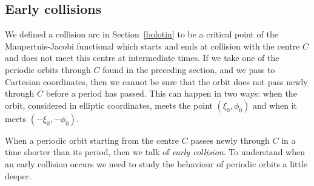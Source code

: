 \documentclass[a4paper]{article}
\begin{document}
\subsection{Early collisions}
\label{early_coll}
We defined a collision arc in Section~\ref{bolotin} to be a critical
point of the Maupertuis-Jacobi functional which starts and ends at
collision with the centre $C$ and does not meet this centre at
intermediate times.  If we take one of the periodic orbits through $C$
found in the preceding section, and we pass to Cartesian coordinates,
then we cannot be sure that the orbit does not pass newly through $C$
before a period has passed.  This can happen in two ways: when the
orbit, considered in elliptic coordinates, meets the point
$(\xi_0,\phi_0)$ and when it meets $(-\xi_0,-\phi_0)$.

When a periodic orbit starting from the centre $C$ passes newly
through $C$ in a time shorter than its period, then we talk of
\emph{early collision}.  To understand when an early collision occurs
we need to study the behaviour of periodic orbits a little deeper.
\end{document}
